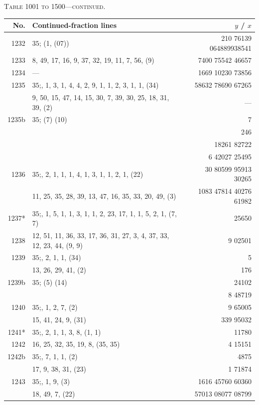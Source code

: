 \documentclass[11pt]{article}
\newcommand{\peheading}{%
  \begin{center}\small\textsc{Table 1001 to 1500---continued.}\end{center}
}
\begin{document}
\peheading
\renewcommand{\arraystretch}{1.15}
{\footnotesize
\begin{longtable}{|r|p{8.5cm}|r|}
\hline
\textbf{No.} & \textbf{Continued-fraction lines} & \textbf{$y$ \;/\; $x$}\\
\hline\endhead
1232   & $35$;\; (1, (07)) & 210 76139 064889938541 \\
\hline
1233   & 8, 49, 17, 16, 9, 37, 32, 19, 11, 7, 56, (9) & 7400 75542 46657 \\
\hline
1234   & --- & 1669 10230 73856 \\
\hline
1235   & $35$;\; 7, 1, 3, 1, 4, 4, 2, 9, 1, 1, 2, 3, 1, 1, (34) & 58632 78690 67265 \\
       & 9, 50, 15, 47, 14, 15, 30, 7, 39, 30, 25, 18, 31, 39, (2) & --- \\
\hline
1235b  & $35$;\; (7) (10) & 7 \\
       & & 246 \\
       & & 18261 82722 \\
       & & 6 42027 25495 \\
\hline
1236   & $35$;\; 6, 2, 1, 1, 1, 4, 1, 3, 1, 1, 2, 1, (22) & 30 80599 95913 30265 \\
       & 11, 25, 35, 28, 39, 13, 47, 16, 35, 33, 20, 49, (3) & 1083 47814 40276 61982 \\
\hline
1237*  & $35$;\; 5, 1, 5, 1, 1, 3, 1, 1, 2, 23, 17, 1, 1, 5, 2, 1, (7, 7) & 25650 \\
1238   & 12, 51, 11, 36, 33, 17, 36, 31, 27, 3, 4, 37, 33, 12, 23, 44, (9, 9) & 9 02501 \\
\hline
1239   & $35$;\; 5, 2, 1, 1, (34) & 5 \\
       & 13, 26, 29, 41, (2) & 176 \\
\hline
1239b  & $35$;\; (5) (14) & 24102 \\
       & & 8 48719 \\
\hline
1240   & $35$;\; 4, 1, 2, 7, (2) & 9 65005 \\
       & 15, 41, 24, 9, (31) & 339 95032 \\
\hline
1241*  & $35$;\; 4, 2, 1, 1, 3, 8, (1, 1) & 11780 \\
1242   & 16, 25, 32, 35, 19, 8, (35, 35) & 4 15151 \\
\hline
1242b  & $35$;\; 4, 7, 1, 1, (2) & 4875 \\
       & 17, 9, 38, 31, (23) & 1 71874 \\
\hline
1243   & $35$;\; 3, 1, 9, (3) & 1616 45760 60360 \\
       & 18, 49, 7, (22) & 57013 08077 08799 \\

\end{longtable}}
\end{document}
